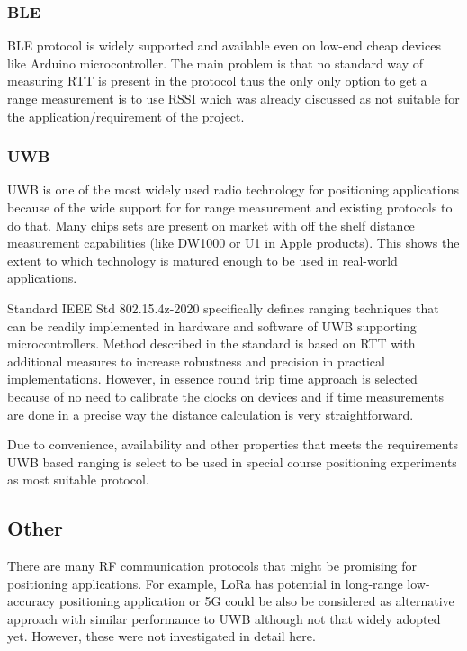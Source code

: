 \subsubsection{BLE}

BLE protocol is widely supported and available even on low-end cheap devices like Arduino microcontroller. The main problem is that no standard way of measuring RTT is present in the protocol thus the only only option to get a range measurement is to use RSSI which was already discussed as not suitable for the application/requirement of the project.

\subsubsection{UWB}

UWB is one of the most widely used radio technology for positioning applications because of the wide support for for range measurement and existing protocols to do that. Many chips sets are present on market with off the shelf distance measurement capabilities (like DW1000 \cite{dw1000chip} or U1 in Apple products). This shows the extent to which technology is matured enough to be used in real-world applications.

Standard IEEE Std 802.15.4z-2020 \cite{9179124} specifically defines ranging techniques that can be readily implemented in hardware and software of UWB supporting microcontrollers. Method described in the standard is based on RTT with additional measures to increase robustness and precision in practical implementations. However, in essence round trip time approach is selected because of no need to calibrate the clocks on devices and if time measurements are done in a precise way the distance calculation is very straightforward.

Due to convenience, availability and other properties that meets the requirements UWB based ranging is select to be used in special course positioning experiments as most suitable protocol.

\subsection{Other}

There are many RF communication protocols that might be promising for positioning applications. For example, LoRa has potential in long-range low-accuracy positioning application or 5G could be also be considered as alternative approach with similar performance to UWB although not that widely adopted yet. However, these were not investigated in detail here.